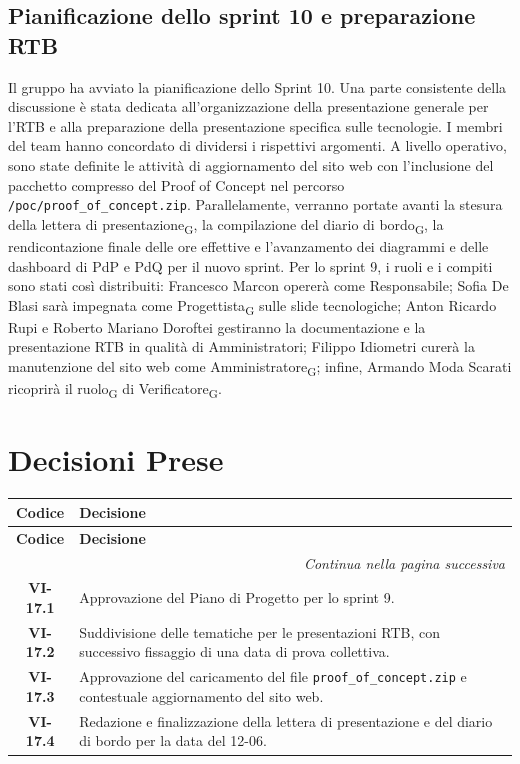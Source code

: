 \subsection{Pianificazione dello sprint 10 e preparazione RTB}
Il gruppo ha avviato la pianificazione dello Sprint 10. Una parte consistente della discussione è stata dedicata all'organizzazione della presentazione generale per l'RTB e alla preparazione della presentazione specifica sulle tecnologie. I membri del team hanno concordato di dividersi i rispettivi argomenti.
A livello operativo, sono state definite le attività di aggiornamento del sito web con l'inclusione del pacchetto compresso del Proof of Concept nel percorso \texttt{/poc/proof\_of\_concept.zip}. Parallelamente, verranno portate avanti la stesura della lettera di presentazione\textsubscript{G}, la compilazione del diario di bordo\textsubscript{G}, la rendicontazione finale delle ore effettive e l'avanzamento dei diagrammi e delle dashboard di PdP e PdQ per il nuovo sprint.
Per lo sprint 9, i ruoli e i compiti sono stati così distribuiti: Francesco Marcon opererà come Responsabile; Sofia De Blasi sarà impegnata come Progettista\textsubscript{G} sulle slide tecnologiche; Anton Ricardo Rupi e Roberto Mariano Doroftei gestiranno la documentazione e la presentazione RTB in qualità di Amministratori; Filippo Idiometri curerà la manutenzione del sito web come Amministratore\textsubscript{G}; infine, Armando Moda Scarati ricoprirà il ruolo\textsubscript{G} di Verificatore\textsubscript{G}.

\section{Decisioni Prese}

\renewcommand{\arraystretch}{1.3}
\vspace{-0.3cm}
\noindent
\begin{longtable}{c p{12cm}}
    \toprule
    \textbf{Codice} & \textbf{Decisione} \\
    \midrule
    \endfirsthead

    \toprule
    \textbf{Codice} & \textbf{Decisione} \\
    \midrule
    \endhead

    \midrule
    \multicolumn{2}{r}{\textit{Continua nella pagina successiva}} \\
    \midrule
    \endfoot

    \bottomrule
    \endlastfoot

    \textbf{VI-17.1} & Approvazione del Piano di Progetto per lo sprint 9. \\[4pt]
    \textbf{VI-17.2} & Suddivisione delle tematiche per le presentazioni RTB, con successivo fissaggio di una data di prova collettiva. \\[4pt]
    \textbf{VI-17.3} & Approvazione del caricamento del file \texttt{proof\_of\_concept.zip} e contestuale aggiornamento del sito web. \\[4pt]
    \textbf{VI-17.4} & Redazione e finalizzazione della lettera di presentazione e del diario di bordo per la data del 12-06. \\[4pt]
\end{longtable}

